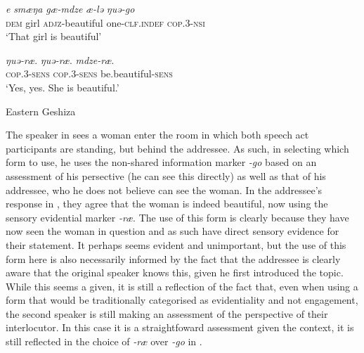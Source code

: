 \begin{exe}
    \ex\label{e:Discussion:GeshizaDialogue}
    \begin{xlist}
        \ex\label{e:Discussion:GeshizaDialogue:A}
        \gll \textit{e} \textit{smæŋa} \textit{gæ-mdze} \textit{æ-lə} \textit{ŋuə-go} \\
        \textsc{dem} girl \textsc{adjz}-beautiful one-\textsc{clf.indef} \textsc{cop.3-nsi} \\
        \glt `That girl is beautiful'

        \ex\label{e:Discussion:GeshizaDialogue:B}
        \gll \textit{ŋuə-ræ}. \textit{ŋuə-ræ}. \textit{mdze-ræ}. \\
        \textsc{cop.3-sens} \textsc{cop.3-sens} be.beautiful-\textsc{sens} \\
        \glt `Yes, yes. She is beautiful.'
    \end{xlist}
    Eastern Geshiza \cite[rGyalrongic: PRC,][593]{Honkasalo2019}
\end{exe}

The speaker in  sees a woman enter the room in which both speech act participants are standing, but behind the addressee. As such, in selecting which form to use, he uses the non-shared information marker \textit{-go} based on an assessment of his persective (he can see this directly) as well as that of his addressee, who he does not believe can see the woman. In the addressee's response in , they agree that the woman is indeed beautiful, now using the sensory evidential marker \textit{-ræ}. The use of this form is clearly because they have now seen the woman in question and as such have direct sensory evidence for their statement. It perhaps seems evident and unimportant, but the use of this form here is also necessarily informed by the fact that the addressee is clearly aware that the original speaker knows this, given he first introduced the topic. While this seems a given, it is still a reflection of the fact that, even when using a form that would be traditionally categorised as evidentiality and not engagement, the second speaker is still making an assessment of the perspective of their interlocutor. In this case it is a straightfoward assessment given the context, it is still reflected in the choice of \textit{-ræ} over \textit{-go} in .

